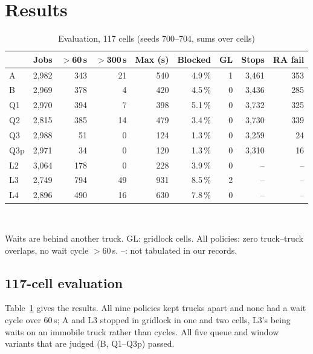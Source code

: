\documentclass[conference]{IEEEtran}
\newcommand{\Qone}{Q1}
\newcommand{\Qtwo}{Q2}
\newcommand{\Qthree}{Q3}
\newcommand{\Qthreep}{Q3p}
\begin{document}
\section{Results}
\label{sec:results}

\begin{table}[t]
\centering
\caption{Evaluation, 117 cells (seeds 700--704, sums over cells)}
\label{tab:main}
\footnotesize
\setlength{\tabcolsep}{2.6pt}
\begin{tabular}{lrrrrrrrr}
\toprule
 & Jobs & $>$60\,s & $>$300\,s & Max (s) & Blocked & GL & Stops & RA fail \\
\midrule
A        & 2,982 & 343 & 21 & 540 & 4.9\,\% & 1 & 3,461 & 353 \\
B        & 2,969 & 378 &  4 & 420 & 4.5\,\% & 0 & 3,436 & 285 \\
\Qone    & 2,970 & 394 &  7 & 398 & 5.1\,\% & 0 & 3,732 & 325 \\
\Qtwo    & 2,815 & 385 & 14 & 479 & 3.4\,\% & 0 & 3,730 & 339 \\
\Qthree  & 2,988 &  51 &  0 & 124 & 1.3\,\% & 0 & 3,259 &  24 \\
\Qthreep & 2,971 &  34 &  0 & 120 & 1.3\,\% & 0 & 3,310 &  16 \\
\midrule
L2       & 3,064 & 178 &  0 & 228 & 3.9\,\% & 0 & -- & -- \\
L3       & 2,749 & 794 & 49 & 931 & 8.5\,\% & 2 & -- & -- \\
L4       & 2,896 & 490 & 16 & 630 & 7.8\,\% & 0 & -- & -- \\
\bottomrule
\end{tabular}\\[2pt]
\parbox{\columnwidth}{\scriptsize Waits are behind another truck. GL:
gridlock cells. All policies: zero truck--truck overlaps, no wait cycle
$>$60\,s. --: not tabulated in our records.}
\end{table}

\subsection{117-cell evaluation}
Table~\ref{tab:main} gives the results. All nine policies kept trucks apart
and none had a wait cycle over 60\,s; A and L3 stopped in gridlock in one and
two cells, L3's being waits on an immobile truck rather than cycles. All five
queue and window variants that are judged (B, \Qone--\Qthreep) passed.
\end{document}
